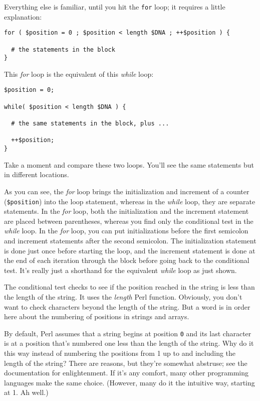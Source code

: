 Everything else is familiar, until you hit the \verb|for| loop; it requires a little explanation: 

\begin{lstlisting}
for ( $position = 0 ; $position < length $DNA ; ++$position ) {
  
  # the statements in the block
}
\end{lstlisting}

This \textit{for} loop is the equivalent of this \textit{while} loop: 

\begin{lstlisting}
$position = 0;

while( $position < length $DNA ) {

  # the same statements in the block, plus ...

  ++$position;
}
\end{lstlisting}

Take a moment and compare these two loops. You'll see the same statements but in different locations.

As you can see, the \textit{for} loop brings the initialization and increment of a counter (\verb|$position|) into the loop statement, whereas in the \textit{while} loop, they are separate statements. In the \textit{for} loop, both the initialization and the increment statement are placed between parentheses, whereas you find only the conditional test in the \textit{while} loop. In the \textit{for} loop, you can put initializations before the first semicolon and increment statements after the second semicolon. The initialization statement is done just once before starting the loop, and the increment statement is done at the end of each iteration through the block before going back to the conditional test. It's really just a shorthand for the equivalent \textit{while} loop as just shown. 

The conditional test checks to see if the position reached in the string is less than the length of the string. It uses the \textit{length} Perl function.  Obviously, you don't want to check characters beyond the length of the string. But a word is in order here about the numbering of positions in strings and arrays.

By default, Perl assumes that a string begins at position \verb|0| and its last character is at a position that's numbered one less than the length of the string. Why do it this way instead of numbering the positions from 1 up to and including the length of the string? There are reasons, but they're somewhat abstruse; see the documentation for enlightenment. If it's any comfort, many other programming languages make the same choice.  (However, many do it the intuitive way, starting at 1. Ah well.)

